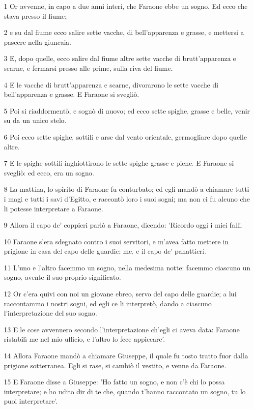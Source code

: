 \par 1 Or avvenne, in capo a due anni interi, che Faraone ebbe un sogno. Ed ecco che stava presso il fiume;
\par 2 e su dal fiume ecco salire sette vacche, di bell'apparenza e grasse, e mettersi a pascere nella giuncaia.
\par 3 E, dopo quelle, ecco salire dal fiume altre sette vacche di brutt'apparenza e scarne, e fermarsi presso alle prime, sulla riva del fiume.
\par 4 E le vacche di brutt'apparenza e scarne, divorarono le sette vacche di bell'apparenza e grasse. E Faraone si svegliò.
\par 5 Poi si riaddormentò, e sognò di nuovo; ed ecco sette spighe, grasse e belle, venir su da un unico stelo.
\par 6 Poi ecco sette spighe, sottili e arse dal vento orientale, germogliare dopo quelle altre.
\par 7 E le spighe sottili inghiottirono le sette spighe grasse e piene. E Faraone si svegliò: ed ecco, era un sogno.
\par 8 La mattina, lo spirito di Faraone fu conturbato; ed egli mandò a chiamare tutti i magi e tutti i savi d'Egitto, e raccontò loro i suoi sogni; ma non ci fu alcuno che li potesse interpretare a Faraone.
\par 9 Allora il capo de' coppieri parlò a Faraone, dicendo: 'Ricordo oggi i miei falli.
\par 10 Faraone s'era sdegnato contro i suoi servitori, e m'avea fatto mettere in prigione in casa del capo delle guardie: me, e il capo de' panattieri.
\par 11 L'uno e l'altro facemmo un sogno, nella medesima notte: facemmo ciascuno un sogno, avente il suo proprio significato.
\par 12 Or c'era quivi con noi un giovane ebreo, servo del capo delle guardie; a lui raccontammo i nostri sogni, ed egli ce li interpretò, dando a ciascuno l'interpretazione del suo sogno.
\par 13 E le cose avvennero secondo l'interpretazione ch'egli ci aveva data: Faraone ristabilì me nel mio ufficio, e l'altro lo fece appiccare'.
\par 14 Allora Faraone mandò a chiamare Giuseppe, il quale fu tosto tratto fuor dalla prigione sotterranea. Egli si rase, si cambiò il vestito, e venne da Faraone.
\par 15 E Faraone disse a Giuseppe: 'Ho fatto un sogno, e non c'è chi lo possa interpretare; e ho udito dir di te che, quando t'hanno raccontato un sogno, tu lo puoi interpretare'.
